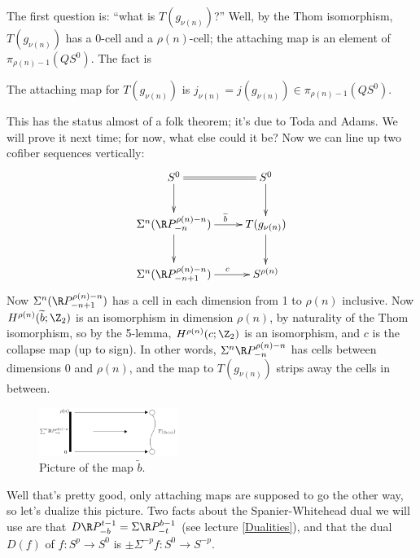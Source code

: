 The first question is: ``what is $T(g_{\nu(n)})$?''  Well, by the Thom isomorphism, $T(g_{\nu(n)})$ has a 0-cell and a $\rho(n)$-cell; the attaching map is an element of $\pi_{\rho(n)-1} (Q S^0)$.  The fact is
\begin{thm}
The attaching map for $T(g_{\nu(n)})$ is $j_{\nu(n)} = j(g_{\nu(n)}) \in \pi_{\rho(n)-1}(QS^0)$.
\end{thm}
This has the status almost of a folk theorem; it's due to Toda and Adams.  We will prove it next time; for now, what else could it be?  Now we can line up two cofiber sequences vertically:
\[\xymatrix{S^0\ar[d]\ar@{=}[r]&S^0\ar[d]\\
\ar[d]\Suspend^n(\RP^{\rho(n)-n}_{-n}) \ar[r]^{\ \ \ \widetilde b}& T(g_{\nu(n)})\ar[d]\\
\Suspend^n (\RP^{\rho(n)-n}_{-n+1}) \ar[r]^{\ \ \ \ c} & S^{\rho(n)}
}\]
Now $\Suspend^n (\RP^{\rho(n)-n}_{-n+1})$ has a cell in each dimension from 1 to $\rho(n)$ inclusive. Now $H^{\rho(n)}(\widetilde b;\Z_2)$ is an isomorphism in dimension $\rho(n)$, by naturality of the Thom isomorphism,  so by the 5-lemma, $H^{\rho(n)}(c;\Z_2)$ is an isomorphism, and $c$ is the collapse map (up to sign).
In other words, $\Suspend^n \RP^{\rho(n)-n}_{-n}$ has cells between dimensions $0$ and $\rho(n)$, and the map to $T(g_{\nu(n)})$ strips away the cells in between.
\begin{figure}[h!]
\centering\includegraphics[width=0.4\textwidth]{figures/figure30.pdf}
\caption{\small Picture of the map $\widetilde b$.}
\end{figure}

Well that's pretty good, only attaching maps are supposed to go the other way, so let's dualize this picture.  Two facts about the Spanier-Whitehead dual we will use are that $D \RP^{t-1}_{-b} = \Suspend \RP^{b-1}_{-t}$ (see lecture \ref{Dualities}), and that the dual $D(f)$ of $f:S^p\to S^0$ is $\pm\Sigma^{-p}f:S^0\to S^{-p}$.

